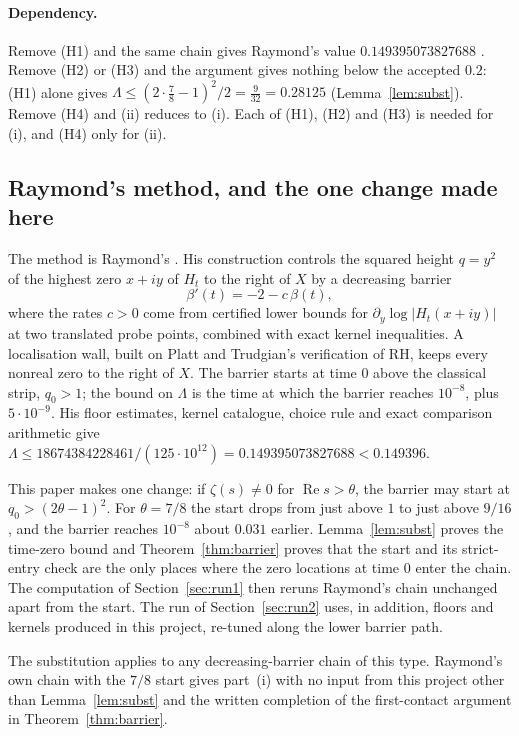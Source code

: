 \documentclass[11pt]{article}
\theoremstyle{definition}
\newcommand{\LB}{\Lambda}
\DeclareMathOperator{\Rea}{Re}
\begin{document}
\paragraph{Dependency.}
Remove (H1) and the same chain gives Raymond's value $0.149395073827688$
\cite{Raymond26}. Remove (H2) or (H3) and the argument gives nothing below the accepted
$0.2$: (H1) alone gives $\LB\le(2\cdot\frac78-1)^2/2=\frac9{32}=0.28125$
(Lemma~\ref{lem:subst}). Remove (H4) and (ii) reduces to (i). Each of (H1), (H2) and (H3)
is needed for (i), and (H4) only for (ii).

\subsection{Raymond's method, and the one change made here}

The method is Raymond's \cite{Raymond26}. His construction controls the squared height
$q=y^2$ of the highest zero $x+iy$ of $H_t$ to the right of $X$ by a decreasing barrier
\[
\beta'(t)=-2-c\,\beta(t),
\]
where the rates $c>0$ come from certified lower bounds for $\partial_y\log|H_t(x+iy)|$
at two translated probe points, combined with exact kernel inequalities. A localisation
wall, built on Platt and Trudgian's verification of RH, keeps every nonreal zero to the
right of $X$. The barrier starts at time $0$ above the classical strip, $q_0>1$; the bound
on $\LB$ is the time at which the barrier reaches $10^{-8}$, plus $5\cdot10^{-9}$. His
floor estimates, kernel catalogue, choice rule and exact comparison arithmetic give
$\LB\le18674384228461/(125\cdot10^{12})=0.149395073827688<0.149396$.

This paper makes one change: if $\zeta(s)\ne0$ for $\Rea s>\theta$, the barrier may start
at $q_0>(2\theta-1)^2$. For $\theta=7/8$ the start drops from just above $1$ to just above
$9/16$, and the barrier reaches $10^{-8}$ about $0.031$ earlier. Lemma~\ref{lem:subst}
proves the time-zero bound and Theorem~\ref{thm:barrier} proves that the start and its
strict-entry check are the only places where the zero locations at time $0$ enter the
chain. The computation of Section~\ref{sec:run1} then reruns Raymond's chain unchanged
apart from the start. The run of Section~\ref{sec:run2} uses, in addition, floors and
kernels produced in this project, re-tuned along the lower barrier path.

The substitution applies to any decreasing-barrier chain of this type. Raymond's own
chain with the $7/8$ start gives part~(i) with no input from this project other than Lemma~\ref{lem:subst} and the written completion of the first-contact
argument in Theorem~\ref{thm:barrier}.
\end{document}

